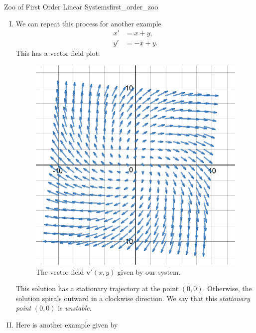 \begin{ex}{Zoo of First Order Linear Systems}{first_order_zoo}
\begin{enumerate}[(I)]
            The solution (curve/trajectory) to our system of ODE follows the vector field above since it describes the velocity of our curve at that point. We call this solution curve an \textbf{integral curve} as it is obtained (roughly) through integration of $\mathbf{v}'$.  However, you should know that it is not always possible to explicitly compute this integral.  We will learn techniques for solving certain systems, however.
            
            One should feel comfortable tracing an estimate for a solution curve for a given system as it gives a qualitative answer to the problem. In this case, if we pick a point along the line $y=-x$, the trajectory is stationary.  Otherwise, the solution follows a curve that is parallel to the $y=x$ line and the direction depends on which location it begins.
            \item We can repeat this process for another example
            \begin{align*}
                x' &= x+y,\\
                y' &= -x +y.
            \end{align*}
            This has a vector field plot:
            \begin{figure}[H]
                \centering
                \includegraphics[width=.6\textwidth]{Figures/x+yx-y.png}
                \caption{The vector field $\mathbf{v}'(x,y)$ given by our system.}
                \label{fig:my_label}
            \end{figure}
            This solution has a stationary trajectory at the point $(0,0)$. Otherwise, the solution spirals outward in a clockwise direction. We say that this \emph{stationary point} $(0,0)$ is \emph{unstable}.
            \item Here is another example given by

\end{enumerate}
\end{ex}
